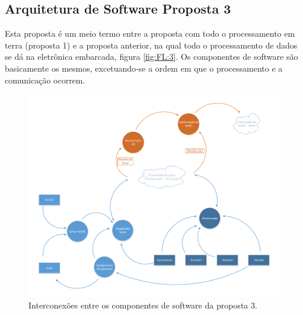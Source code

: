 \subsection{Arquitetura de Software Proposta 3}
Esta proposta é um meio termo entre a proposta com todo o processamento em terra
(proposta 1) e a proposta anterior, na qual todo o processamento de dados se dá
na eletrônica embarcada, figura \ref{fig:FL:3}. Os componentes de software são
basicamente os mesmos, excetuando-se a ordem em que o processamento e a comunicação ocorrem.




\begin{figure}[H]
\centering
\includegraphics[width=\textwidth,height=\textheight,keepaspectratio]{figs/software/EstrutSoft/prop1_soft_3.pdf}
\caption{Interconexões entre os componentes de software da proposta 3.}
\label{fig:ES:3}
\end{figure}

